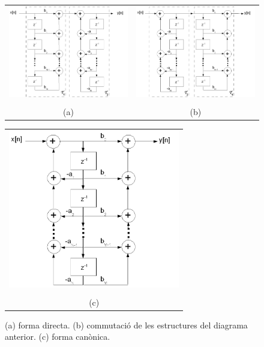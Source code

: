 \documentclass{article}
\begin{document}
\begin{figure}[htbp]
\begin{center}
\begin{tabular}{cc}
\includegraphics[width=8cm]{formadirecta.png} &
\includegraphics[width=8cm]{formacommutada.png} \\ \\
(a) & (b) 
\end{tabular}
\begin{tabular}{c}
\includegraphics[width=7.5cm]{formacanonica.png} \\ \\
(c)
\end{tabular}
\end{center}
\caption{(a) forma directa. (b) commutaci\'o de les estructures
del diagrama anterior. (c) forma can\`onica.}
\label{blocsLTI}
\end{figure}
\end{document}
